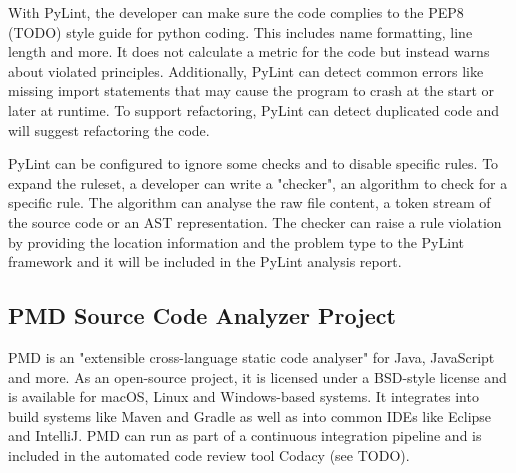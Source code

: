 With PyLint, the developer can make sure the code complies to the PEP8 (TODO) style guide for python coding. This includes name formatting, line length and more. It does not calculate a metric for the code but instead warns about violated principles. Additionally, PyLint can detect common errors like missing import statements that may cause the program to crash at the start or later at runtime. To support refactoring, PyLint can detect duplicated code and will suggest refactoring the code.

PyLint can be configured to ignore some checks and to disable specific rules. To expand the ruleset, a developer can write a "checker", an algorithm to check for a specific rule. The algorithm can analyse the raw file content, a token stream of the source code or an AST representation. The checker can raise a rule violation by providing the location information and the problem type to the PyLint framework and it will be included in the PyLint analysis report.

\subsection{PMD Source Code Analyzer Project}
PMD is an "extensible cross-language static code analyser" for Java, JavaScript and more. As an open-source project, it is licensed under a BSD-style license and is available for macOS, Linux and Windows-based systems. It integrates into build systems like Maven and Gradle as well as into common IDEs like Eclipse and IntelliJ. PMD can run as part of a continuous integration pipeline and is included in the automated code review tool Codacy (see TODO).

